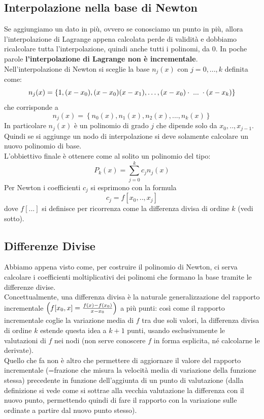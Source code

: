 \documentclass[12pt,a4paper,]{report}
\newcommand{\s}{\hspace{1mm}}
\begin{document}
\subsection{Interpolazione nella base di Newton}
Se aggiungiamo un dato in più, ovvero se conosciamo un punto in più, allora l'interpolazione di Lagrange appena calcolata perde di validità e dobbiamo ricalcolare tutta l'interpolazione, quindi anche tutti i polinomi, da 0.
In poche parole \textbf{l'interpolazione di Lagrange non è incrementale}.\\
Nell'interpolazione di Newton si sceglie la base $n_j(x)$ con $j=0,...,k$ definita come:
\[
n_j(x) = \left\{ 1, (x - x_0), (x - x_0)(x - x_1),\dots ,(x - x_0)\cdot \s ... \s \cdot (x - x_k) \right\}
\]
che corrisponde a
\[
n_j(x) = \left\{ n_0(x), n_1(x), n_2(x), ..., n_k(x) \right\}
\]
In particolare $n_j(x)$ è un polinomio di grado $j$ che dipende solo da $x_0,..,x_{j-1}$. 
Quindi se si aggiunge un nodo di interpolazione si deve solamente calcolare un nuovo polinomio di base.\\
L'obbiettivo finale è ottenere come al solito un polinomio del tipo:
\[
P_k(x) = \sum_{j=0}^k c_j n_j(x)
\]
Per Newton i coefficienti $c_j$ si esprimono con la formula
\[
c_j = f\left[x_0,..,x_j\right]
\]
dove $f\left[...\right]$ si definisce per ricorrenza come la differenza divisa di ordine $k$ (vedi sotto).


\begin{lezione}
    [Lezione 14 19/04]
\end{lezione}

\subsection{Differenze Divise}
Abbiamo appena visto come, per costruire il polinomio di Newton, ci serva calcolare i coefficienti moltiplicativi dei polinomi che formano la base tramite le differenze divise.\\
Concettualmente, una differenza divisa è la naturale generalizzazione del rapporto incrementale
$
\Bigl(
f[x_0,x] = \frac{f(x)-f(x_0)}{x-x_0}
\Bigr)
$
a più punti: così come il rapporto incrementale coglie la variazione media di $f$ tra due soli valori, la differenza divisa di ordine $k$ estende questa idea a $k+1$ punti, usando esclusivamente le valutazioni di $f$ nei nodi (non serve conoscere $f$ in forma esplicita, né calcolarne le derivate).\\
Quello che fa non è altro che permettere di aggiornare il valore del rapporto incrementale (=frazione che misura la velocità media di variazione della funzione stessa) precedente in funzione dell'aggiunta di un punto di valutazione (dalla definizione si vede come si sottrae alla vecchia valutazione la differenza con il nuovo punto, permettendo quindi di fare il rapporto con la variazione sulle ordinate a partire dal nuovo punto stesso).
\end{document}
